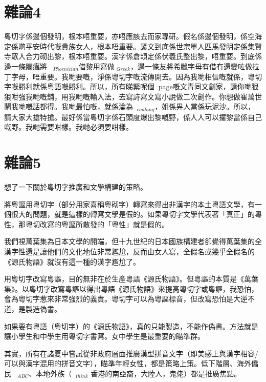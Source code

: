 \section{雜論4}
粵切字係邊個發明，根本唔重要，亦唔應該去而家專研。假名係邊個發明，係空海定係啲平安時代嘅貴族女人，根本唔重要。諺文到底係世宗單人匹馬發明定係集賢寺眾人合力砌出黎，根本唔重要。漢字係倉頡定係伏羲氏整出黎，唔重要。到底係邊一條躝癱將$_{Phoenician}$借黎用寫做$_{Greek}$，邊一條友將希臘字母有借冇還變咗做拉丁字母，唔重要。我哋要嘅，淨係粵切字嘅流傳開去。因為我哋相信嘅就係，粵切字嘅勝利就係粵語嘅勝利。所以，所有睇緊呢個page嘅文青同文創家，請你哋狠狠咁強我哋嘅舖，用我哋嘅輸入法，去寫詩寫文寫小說做二次創作。你想做崔萬世鬧我哋嘅話都得。我哋最怕嘅，就係淪為$_{con lang}$，姐係畀人當係玩泥沙。所以，請大家大搶特搶。最好係當粵切字係石頭度爆出黎嘅野，係人人可以攞黎當係自己嘅野。我哋需要咁樣。我哋必須要咁樣。



\section{雜論5}
想了一下關於粵切字推廣和文學構建的策略。

將粵謳用粵切字（部分用家喜稱粵砌字）轉寫來得出非漢字的本土粵語文學，有一個很大的問題，就是這樣的轉寫文學是假的。如果粵切字文學代表著「真正」的粵性，那粵切改寫的粵謳所散發的「粵性」就是假的。

我們視萬葉集為日本文學的開端，但十九世紀的日本國族構建者卻覺得萬葉集的全漢字性還是讓他們的文化地位非常尷尬，反而由女人寫，全假名或幾乎全假名的《源氏物語》就沒有這一種的漢字尷尬了。

用粵切字改寫粵謳，目的無非在於生產粵語《源氏物語》。但粵謳的本質是《萬葉集》。以粵切字改寫粵謳以得出粵語《源氏物語》來提高粵切字或粵謳，我恐怕，會為粵切字惹來非常強烈的義責。粵切字可以為粵謳標音，但改寫恐怕是大逆不道，是製造偽書。

如果要有粵語（粵切字）的《源氏物語》，真的只能製造，不能作偽書。方法就是讓小學生和中學生用粵切字書寫。女中學生是最重要的瞄準群。

其實，所有在諸夏中嘗試從非政府層面推廣漢型拼音文字（即美感上與漢字相容/可以與漢字混用的拼音文字），瞄準年輕女性，都是策略上策。低下階層、海外僑民$_{ABC}$、本地外族（$_{think}$ 香港的南亞裔，大陸人，鬼佬）都是推廣焦點。

